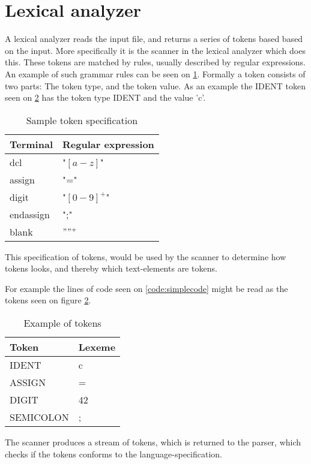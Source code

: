 
\section{Lexical analyzer}
A lexical analyzer reads the input file, and returns a series of tokens based based on the input. More specifically it is the scanner in the lexical analyzer which does this. These tokens are matched by rules, usually described by regular expressions. An example of such grammar rules can be seen on \ref{tab:tokenspecification}. Formally a token consists of two parts: The token type, and the token value. As an example the IDENT token seen on \ref{tab:tokensexample} has the token type IDENT and the value 'c'. 

\begin{table}[H]
\begin{tabular}{|l|l|}
\hline
    	Terminal  	& Regular expression 	\\ \hline
    	dcl       	& "$[a-z]$"      			\\ 
    	assign    	& "="      				\\ 
    	digit     	& "$[0-9]^+$"   			\\ 
    	endassign 	& ";"      				\\
    	blank 		& $" "^+$					\\
    \hline
\end{tabular}
\caption{Sample token specification}
\label{tab:tokenspecification}
\end{table}
This specification of tokens, would be used by the scanner to determine how tokens looks, and thereby which text-elements are tokens. 


For example the lines of code seen on \ref{code:simplecode} might be read as the tokens seen on figure \ref{tab:tokensexample}.
\begin{table}[H]
\begin{tabular}{|l|l|}
\hline
    Token     & Lexeme \\ \hline
    IDENT     & c      \\ 
    ASSIGN    & =      \\ 
    DIGIT     & 42     \\ 
    SEMICOLON & ;      \\
    \hline
\end{tabular}
\caption{Example of tokens}
\label{tab:tokensexample}
\end{table}
The scanner produces a stream of tokens, which is returned to the parser, which checks if the tokens conforms to the language-specification.